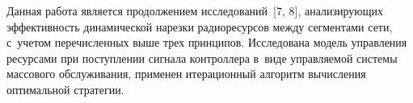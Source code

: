 \begin{multicols}{2}
  Данная работа является продолжением исследований~[7, 8], 
анализирующих эф\-фек\-тив\-ность динамической нарезки радиоресурсов между 
сегментами сети, с~учетом перечисленных выше трех \mbox{принципов}. Исследована 
модель управ\-ле\-ния ресурсами при поступлении сигнала контроллера в~виде 
управ\-ля\-емой сис\-те\-мы массового обслуживания, применен итерационный 
алгоритм вы\-чис\-ле\-ния оптимальной стратегии.

\end{multicols}

\begin{figure*} %
\vspace*{1pt}
  \begin{center}  
    \mbox{%
\epsfxsize=158.384mm
}

\end{center}
\vspace*{-6pt}
\end{figure*}
 


